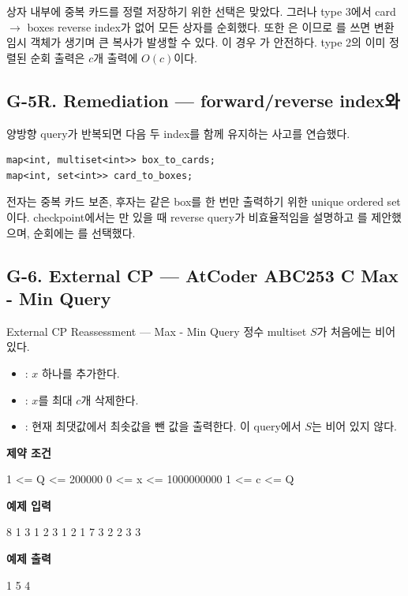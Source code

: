 \begin{notebox}
상자 내부에 중복 카드를 정렬 저장하기 위한  선택은 맞았다. 그러나 type 3에서 card $\to$ boxes reverse index가 없어 모든 상자를 순회했다. 또한 은 이므로 를 쓰면 변환 임시 객체가 생기며 큰  복사가 발생할 수 있다. 이 경우 가 안전하다. type 2의 이미 정렬된  순회 출력은 $c$개 출력에 $O(c)$이다.
\end{notebox}

\subsection{G-5R. Remediation --- forward/reverse index와 }
양방향 query가 반복되면 다음 두 index를 함께 유지하는 사고를 연습했다.
\begin{lstlisting}
map<int, multiset<int>> box_to_cards;
map<int, set<int>> card_to_boxes;
\end{lstlisting}
전자는 중복 카드 보존, 후자는 같은 box를 한 번만 출력하기 위한 unique ordered set이다. checkpoint에서는 만 있을 때 reverse query가 비효율적임을 설명하고 를 제안했으며,  순회에는 를 선택했다.

\subsection{G-6. External CP --- AtCoder ABC253 C Max - Min Query}
\begin{problembox}{External CP Reassessment --- Max - Min Query}
정수 multiset $S$가 처음에는 비어 있다.
\begin{itemize}
\item {}: $x$ 하나를 추가한다.
\item {}: $x$를 최대 $c$개 삭제한다.
\item {}: 현재 최댓값에서 최솟값을 뺀 값을 출력한다. 이 query에서 $S$는 비어 있지 않다.
\end{itemize}

\textbf{제약 조건}
\begin{TextBlock}
1 <= Q <= 200000
0 <= x <= 1000000000
1 <= c <= Q
\end{TextBlock}

\textbf{예제 입력}
\begin{TextBlock}
8
1 3
1 2
3
1 2
1 7
3
2 2 3
3
\end{TextBlock}

\textbf{예제 출력}
\begin{TextBlock}
1
5
4
\end{TextBlock}
\end{problembox}

